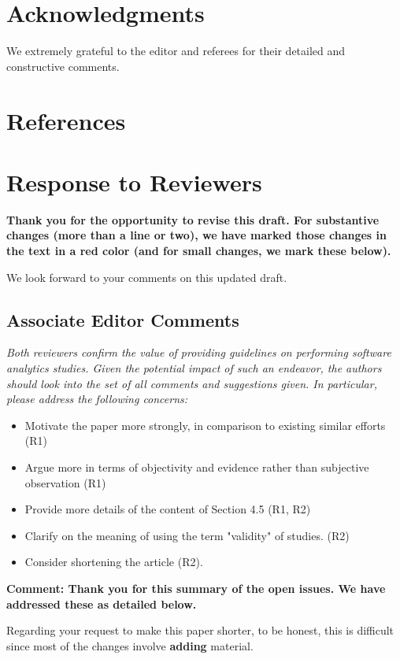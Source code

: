 \documentclass[preprint,10pt]{elsarticle}
\newcommand{\bi}{\begin{itemize}}
\newcommand{\ei}{\end{itemize}}
\newcommand{\RED}{\color{red}}
\newcommand{\BLACK}{\color{black}}
\begin{document}
\section*{Acknowledgments}
\noindent
We extremely grateful to the editor and referees for their detailed and constructive comments.



\section*{References}


 

\newpage
\section*{Response to Reviewers}

{\bf Thank you for the opportunity to revise this draft. For substantive changes (more than a line or two), we have marked those changes \RED in the text in a red color \BLACK (and for small changes, we mark these below).

We look forward to your comments on this updated draft.}

\subsection*{Associate Editor Comments}


{\em Both reviewers confirm the value of providing guidelines on performing software analytics studies. Given the potential impact of such an endeavor, the authors should look into the set of all comments and suggestions given. In particular, please address the following concerns: 
\bi
\item  Motivate the paper more strongly, in comparison to existing similar efforts (R1)
\item  Argue more in terms of objectivity and evidence rather than subjective observation (R1)
\item Provide more details of the content of Section 4.5 (R1, R2)
\item Clarify on the meaning of using the term "validity" of studies. (R2)
\item Consider shortening the article (R2). 
\ei
}

{\bf Comment: Thank you for this summary of the open issues. We have addressed these as detailed below. 

Regarding  your request to make this paper shorter, to be honest, this is difficult since most of the changes involve {\bf adding} material.   }
\end{document}
